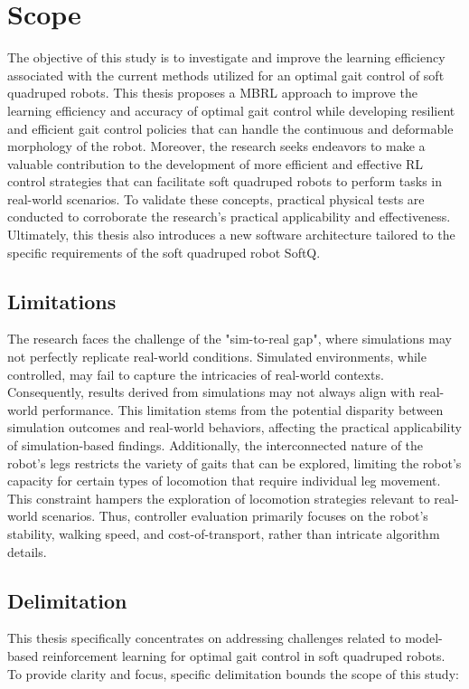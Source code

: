 \section{Scope}
The objective of this study is to investigate and improve the learning efficiency associated with the current methods utilized for an optimal gait control of soft quadruped robots. This thesis proposes a \ac{MBRL} approach to improve the learning efficiency and accuracy of optimal gait control while developing resilient and efficient gait control policies that can handle the continuous and deformable morphology of the robot. Moreover, the research seeks endeavors to make a valuable contribution to the development of more efficient and effective \ac{RL} control strategies that can facilitate soft quadruped robots to perform tasks in real-world scenarios. To validate these concepts, practical physical tests are conducted to corroborate the research's practical applicability and effectiveness. Ultimately, this thesis also introduces a new software architecture tailored to the specific requirements of the  soft quadruped robot SoftQ.

\subsection*{Limitations}
The research faces the challenge of the "sim-to-real gap", where simulations may not perfectly replicate real-world conditions. Simulated environments, while controlled, may fail to capture the intricacies of real-world contexts. Consequently, results derived from simulations may not always align with real-world performance. This limitation stems from the potential disparity between simulation outcomes and real-world behaviors, affecting the practical applicability of simulation-based findings. Additionally, the interconnected nature of the robot's legs restricts the variety of gaits that can be explored, limiting the robot's capacity for certain types of locomotion that require individual leg movement. This constraint hampers the exploration of locomotion strategies relevant to real-world scenarios. Thus, controller evaluation primarily focuses on the robot's stability, walking speed, and cost-of-transport, rather than intricate algorithm details.

\subsection*{Delimitation}
This thesis specifically concentrates on addressing challenges related to model-based reinforcement learning for optimal gait control in soft quadruped robots. To provide clarity and focus, specific delimitation bounds the scope of this study:

